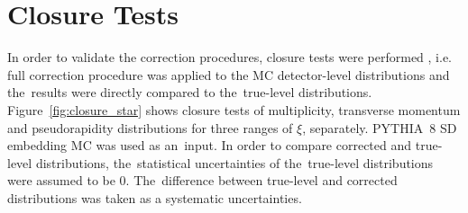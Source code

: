 \section{Closure Tests}\label{section:star_closure}
In order to  validate the correction procedures, 
closure tests were performed , i.e. full correction procedure was applied to the MC detector-level distributions and the~results were directly compared to the~true-level distributions. Figure~\ref{fig:closure_star} shows closure tests of multiplicity, transverse momentum and pseudorapidity distributions for three ranges of $\xi$, separately.  PYTHIA~8 SD embedding \ac{MC} was used as an~input. In order  to compare  corrected and true-level distributions, the~statistical uncertainties of the~true-level distributions were assumed to be $0$. %
The~difference between true-level and corrected distributions was taken as a systematic uncertainties.


